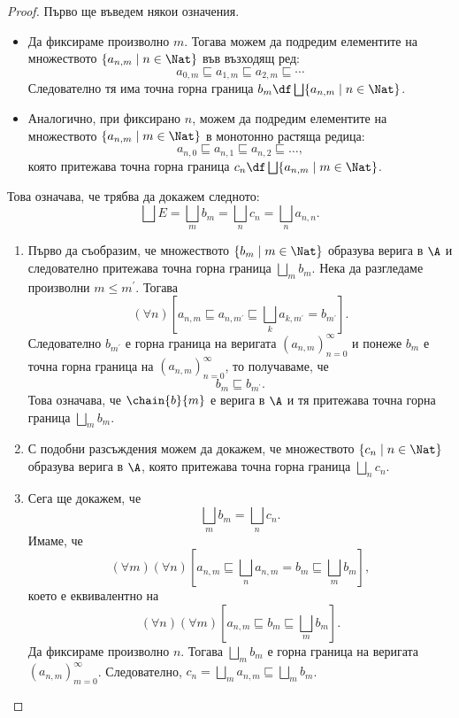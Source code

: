 \begin{proof}
  Първо ще въведем някои означения.
  \begin{itemize}
  \item 
    Да фиксираме произволно $m$. Тогава можем да подредим елементите на множеството $\{a_{n,m} \mid n \in \Nat\}$ във възходящ ред: 
    \[a_{0,m} \sqsubseteq a_{1,m} \sqsubseteq a_{2,m} \sqsubseteq \cdots\]
    Следователно тя има точна горна граница $b_m \df \bigsqcup \{a_{n,m} \mid n \in \Nat\}$.
  \item
    Аналогично, при фиксирано $n$, можем да подредим елементите на множеството $\{a_{n,m} \mid m \in \Nat\}$ в монотонно растяща редица:
    \[a_{n,0} \sqsubseteq a_{n,1} \sqsubseteq a_{n,2} \sqsubseteq \ldots,\]
    която притежава точна горна граница $c_n \df \bigsqcup \{a_{n,m} \mid m \in \Nat\}$.
  \end{itemize}
  Това означава, че трябва да докажем следното:
  \[\bigsqcup E = \bigsqcup_mb_m = \bigsqcup_n c_n = \bigsqcup_n a_{n,n}.\]
  \begin{enumerate}[1)]
  \item 
    Първо да съобразим, че множеството $\{b_m \mid m \in \Nat\}$ образува верига в $\A$ и следователно притежава точна горна граница $\bigsqcup_m b_m$.
    Нека да разгледаме произволни $m \leq m^\prime$.
    Тогава \[(\forall n)[a_{n,m} \sqsubseteq a_{n,m^\prime} \sqsubseteq \bigsqcup_k a_{k,m^\prime} = b_{m^\prime}].\]
    Следователно $b_{m^\prime}$ е горна граница на веригата $(a_{n,m})^{\infty}_{n=0}$ и понеже $b_m$ е точна горна граница на $(a_{n,m})^{\infty}_{n=0}$, то получаваме, че \[b_m \sqsubseteq b_{m^\prime}.\]
    Това означава, че $\chain{b}{m}$ е верига в $\A$ и тя притежава точна горна граница $\bigsqcup_m b_m$.  
  \item
    С подобни разсъждения можем да докажем, че множеството $\{c_n \mid n \in \Nat\}$ образува верига в $\A$, която притежава точна горна граница $\bigsqcup_n c_n$.
  \item
    Сега ще докажем, че \[\bigsqcup_m b_m = \bigsqcup_n c_n.\]
    Имаме, че 
    \[(\forall m)(\forall n)[a_{n,m} \sqsubseteq \bigsqcup_na_{n,m} = b_m \sqsubseteq \bigsqcup_m b_m],\]
    което е еквивалентно на 
    \[(\forall n)(\forall m)[a_{n,m} \sqsubseteq b_m \sqsubseteq \bigsqcup_m b_m].\]
    Да фиксираме произволно $n$.
    Тогава $\bigsqcup_m b_m$ е горна граница на веригата $(a_{n,m})^\infty_{m=0}$.
    Следователно, $c_n = \bigsqcup_m a_{n,m} \sqsubseteq \bigsqcup_m b_m$.

\end{enumerate}
\end{proof}
